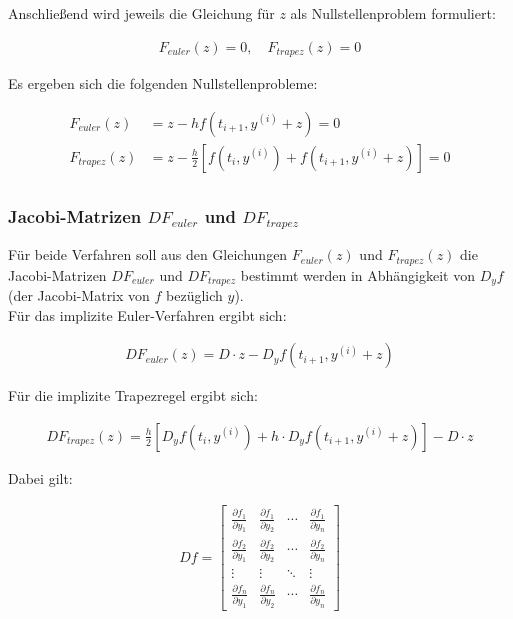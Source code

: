 \documentclass[
	pagesize,
	fontsize=12pt,
	paper=a4,
	oneside,
   reqno
]{scrartcl}
\begin{document}
Anschließend wird jeweils die Gleichung für $z$ als Nullstellenproblem formuliert:

\begin{align*}
   F_{euler}(z) = 0, \quad F_{trapez}(z) = 0
\end{align*}

Es ergeben sich die folgenden Nullstellenprobleme:

\begin{align*}
   F_{euler}(z) &= z - hf(t_{i+1},y^{(i)} + z) = 0 \\
   F_{trapez}(z) &= z - \frac{h}{2}\left[ f(t_{i},y^{(i)}) + f(t_{i+1},y^{(i)} + z) \right] = 0 \\
\end{align*}

\subsubsection{Jacobi-Matrizen $DF_{euler}$ und $DF_{trapez}$}

Für beide Verfahren soll aus den Gleichungen $F_{euler}(z)$ und $F_{trapez}(z)$ die Jacobi-Matrizen $DF_{euler}$ und $DF_{trapez}$ bestimmt werden in Abhängigkeit von $D_yf$ (der Jacobi-Matrix von $f$ bezüglich $y$).\\

Für das implizite Euler-Verfahren ergibt sich:

\begin{align*}
   DF_{euler}(z) = D \cdot z - D_yf(t_{i+1},y^{(i)} + z)
\end{align*}

Für die implizite Trapezregel ergibt sich:

\begin{align*}
   DF_{trapez}(z) = \frac{h}{2}\left[ D_yf(t_{i},y^{(i)}) + h \cdot D_yf(t_{i+1},y^{(i)} + z) \right] - D \cdot z
\end{align*}

Dabei gilt:

\begin{align*}
   Df =
   \begin{bmatrix*}
      \frac{\partial f_1}{\partial y_1} & \frac{\partial f_1}{\partial y_2} & \cdots & \frac{\partial f_1}{\partial y_n} \\
      \frac{\partial f_2}{\partial y_1} & \frac{\partial f_2}{\partial y_2} & \cdots & \frac{\partial f_2}{\partial y_n} \\
      \vdots & \vdots & \ddots & \vdots \\
      \frac{\partial f_n}{\partial y_1} & \frac{\partial f_n}{\partial y_2} & \cdots & \frac{\partial f_n}{\partial y_n}
   \end{bmatrix*}
\end{align*}
\end{document}
